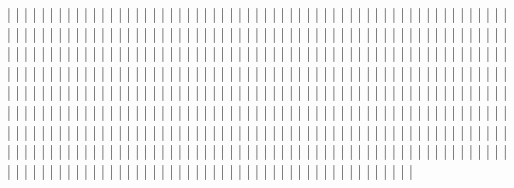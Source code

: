    |
   |
   |
   |
   |
   |
   |
   |
   |
   |
   |
   |
   |
   |
   |
   |
   |
   |
   |
   |
   |
   |
   |
   |
   |
   |
   |
   |
   |
   |
   |
   |
   |
   |
   |
   |
   |
   |
   |
   |
   |
   |
   |
   |
   |
   |
   |
   |
   |
   |
   |
   |
   |
   |
   |
   |
   |
   |
   |
   |
   |
   |
   |
   |
   |
   |
   |
   |
   |
   |
   |
   |
   |
   |
   |
   |
   |
   |
   |
   |
   |
   |
   |
   |
   |
   |
   |
   |
   |
   |
   |
   |
   |
   |
   |
   |
   |
   |
   |
   |
   |
   |
   |
   |
   |
   |
   |
   |
   |
   |
   |
   |
   |
   |
   |
   |
   |
   |
   |
   |
   |
   |
   |
   |
   |
   |
   |
   |
   |
   |
   |
   |
   |
   |
   |
   |
   |
   |
   |
   |
   |
   |
   |
   |
   |
   |
   |
   |
   |
   |
   |
   |
   |
   |
   |
   |
   |
   |
   |
   |
   |
   |
   |
   |
   |
   |
   |
   |
   |
   |
   |
   |
   |
   |
   |
   |
   |
   |
   |
   |
   |
   |
   |
   |
   |
   |
   |
   |
   |
   |
   |
   |
   |
   |
   |
   |
   |
   |
   |
   |
   |
   |
   |
   |
   |
   |
   |
   |
   |
   |
   |
   |
   |
   |
   |
   |
   |
   |
   |
   |
   |
   |
   |
   |
   |
   |
   |
   |
   |
   |
   |
   |
   |
   |
   |
   |
   |
   |
   |
   |
   |
   |
   |
   |
   |
   |
   |
   |
   |
   |
   |
   |
   |
   |
   |
   |
   |
   |
   |
   |
   |
   |
   |
   |
   |
   |
   |
   |
   |
   |
   |
   |
   |
   |
   |
   |
   |
   |
   |
   |
   |
   |
   |
   |
   |
   |
   |
   |
   |
   |
   |
   |
   |
   |
   |
   |
   |
   |
   |
   |
   |
   |
   |
   |
   |
   |
   |
   |
   |
   |
   |
   |
   |
   |
   |
   |
   |
   |
   |
   |
   |
   |
   |
   |
   |
   |
   |
   |
   |
   |
   |
   |
   |
   |
   |
   |
   |
   |
   |
   |
   |
   |
   |
   |
   |
   |
   |
   |
   |
   |
   |
   |
   |
   |
   |
   |
   |
   |
   |
   |
   |
   |
   |
   |
   |
   |
   |
   |
   |
   |
   |
   |
   |
   |
   |
   |
   |
   |
   |
   |
   |
   |
   |
   |
   |
   |
   |
   |
   |
   |
   |
   |
   |
   |
   |
   |
   |
   |
   |
   |
   |
   |
   |
   |
   |
   |
   |
   |
   |
   |
   |
   |
   |
   |
   |
   |
   |
   |
   |
   |
   |
   |
   |
   |
   |
   |
   |
   |
   |
   |
   |
   |
   |
   |
   |
   |
   |
   |
   |
   |
   |
   |
   |
   |
   |
   |
   |
   |
   |
   |
   |
   |
   |
   |
   |
   |
   |
   |
   |
   |
   |
   |
   |
   |
   |
   |
   |
   |
   |
   |
   |
   |
   |
   |
   |
   |
   |
   |
   |
   |
   |
   |
   |
   |
   |
   |
   |
   |
   |
   |
   |
   |
   |
   |
   |
   |
   |
   |
   |
   |
   |
   |
   |
   |
   |
   |
   |
   |
   |
   |
   |
   |
   |
   |
   |
   |
   |
   |
   |
   |

